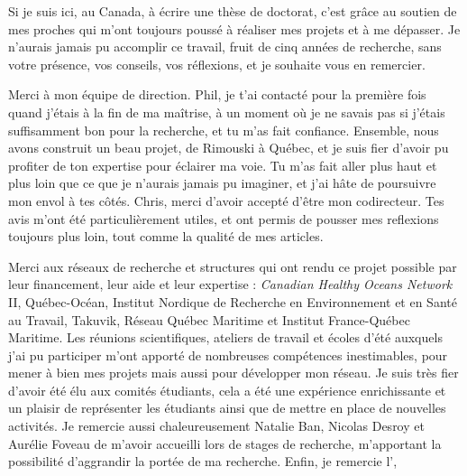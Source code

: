 Si je suis ici, au Canada, à écrire une thèse de doctorat, c'est grâce
au soutien de mes proches qui m'ont toujours poussé à réaliser mes
projets et à me dépasser. Je n'aurais jamais pu accomplir ce travail,
fruit de cinq années de recherche, sans votre présence, vos conseils,
vos réflexions, et je souhaite vous en remercier.

Merci à mon équipe de direction. Phil, je t'ai contacté pour la première
fois quand j'étais à la fin de ma maîtrise, à un moment où je ne savais
pas si j'étais suffisamment bon pour la recherche, et tu m'as fait
confiance. Ensemble, nous avons construit un beau projet, de Rimouski à
Québec, et je suis fier d'avoir pu profiter de ton expertise pour
éclairer ma voie. Tu m'as fait aller plus haut et plus loin que ce que
je n'aurais jamais pu imaginer, et j'ai hâte de poursuivre mon envol à
tes côtés. Chris, merci d'avoir accepté d'être mon codirecteur. Tes avis
m'ont été particulièrement utiles, et ont permis de pousser mes
reflexions toujours plus loin, tout comme la qualité de mes articles.

Merci aux réseaux de recherche et structures qui ont rendu ce projet
possible par leur financement, leur aide et leur expertise :
\emph{Canadian Healthy Oceans Network} II, Québec-Océan, Institut
Nordique de Recherche en Environnement et en Santé au Travail, Takuvik,
Réseau Québec Maritime et Institut France-Québec Maritime. Les réunions
scientifiques, ateliers de travail et écoles d'été auxquels j'ai pu
participer m'ont apporté de nombreuses compétences inestimables, pour
mener à bien mes projets mais aussi pour développer mon réseau. Je suis
très fier d'avoir été élu aux comités étudiants, cela a été une
expérience enrichissante et un plaisir de représenter les étudiants
ainsi que de mettre en place de nouvelles activités. Je remercie aussi
chaleureusement Natalie Ban, Nicolas Desroy et Aurélie Foveau de m'avoir
accueilli lors de stages de recherche, m'apportant la possibilité
d'aggrandir la portée de ma recherche. Enfin, je remercie l',


